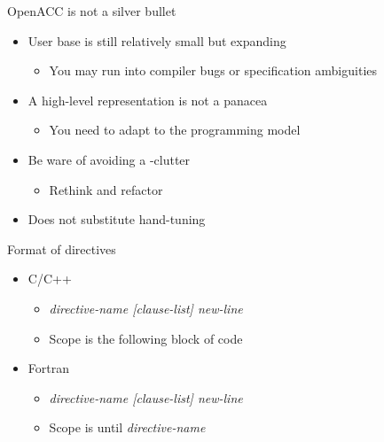 \documentclass[12pt,aspectratio=169]{beamer}
\begin{document}
\begin{frame}{OpenACC is not a silver bullet}
  \begin{itemize}
  \item User base is still relatively small but expanding
    \begin{itemize}
    \item You may run into compiler bugs or specification ambiguities
    \end{itemize}
  \item A high-level representation is not a panacea
    \begin{itemize}
    \item You need to adapt to the programming model
    \end{itemize}
  \item Be ware of avoiding a -clutter
    \begin{itemize}
    \item Rethink and refactor
    \end{itemize}
  \item Does not substitute hand-tuning
  \end{itemize}
\end{frame}

\begin{frame}[fragile]{Format of directives}
  \begin{itemize}
  \item C/C++
    \begin{itemize}
    \item {} \emph{directive-name [clause-list]
      new-line}
    \item Scope is the following block of code
    \end{itemize}
  \item Fortran
    \begin{itemize}
    \item {} \emph{directive-name [clause-list]
      new-line}
    \item Scope is until  \emph{directive-name}
    \end{itemize}
  \end{itemize}
\end{frame}
\end{document}
